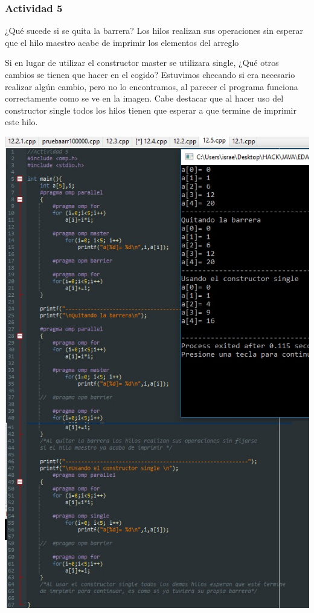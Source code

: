 \documentclass[12pt,letterpaper]{article}
\begin{document}
\subsubsection*{Actividad 5}
¿Qué sucede si se quita la barrera? Los hilos realizan sus operaciones sin esperar que el hilo maestro acabe de imprimir los elementos del arreglo

Si en lugar de utilizar el constructor master se utilizara single, ¿Qué otros cambios se tienen que hacer en el cogido? Estuvimos checando si era necesario realizar algún cambio, pero no lo encontramos, al parecer el programa funciona correctamente como se ve en la imagen. Cabe destacar que al hacer uso del constructor single todos los hilos tienen que esperar a que termine de imprimir este hilo.

\includegraphics[scale=.8]{18.jpg}
\newpage
\end{document}
